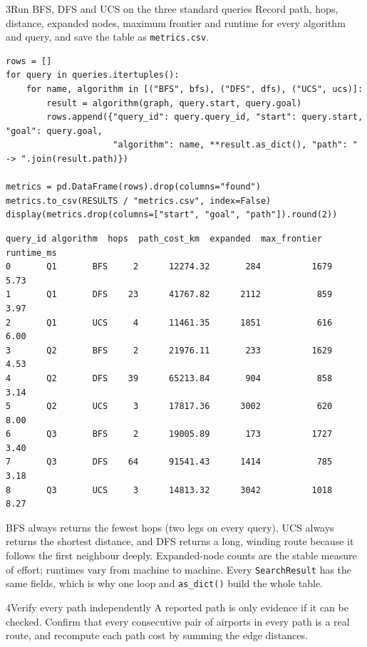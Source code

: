 \begin{labquestion}{3}{Run BFS, DFS and UCS on the three standard queries}
Record path, hops, distance, expanded nodes, maximum frontier and runtime for every algorithm and query, and save the table as \texttt{metrics.csv}.
\end{labquestion}

\begin{labanswer}
\begin{lstlisting}[style=utppython]
rows = []
for query in queries.itertuples():
    for name, algorithm in [("BFS", bfs), ("DFS", dfs), ("UCS", ucs)]:
        result = algorithm(graph, query.start, query.goal)
        rows.append({"query_id": query.query_id, "start": query.start, "goal": query.goal,
                     "algorithm": name, **result.as_dict(), "path": " -> ".join(result.path)})

metrics = pd.DataFrame(rows).drop(columns="found")
metrics.to_csv(RESULTS / "metrics.csv", index=False)
display(metrics.drop(columns=["start", "goal", "path"]).round(2))
\end{lstlisting}
\expectedoutput
\begin{lstlisting}[style=utpterminal]
  query_id algorithm  hops  path_cost_km  expanded  max_frontier  runtime_ms
0       Q1       BFS     2      12274.32       284          1679        5.73
1       Q1       DFS    23      41767.82      2112           859        3.97
2       Q1       UCS     4      11461.35      1851           616        6.00
3       Q2       BFS     2      21976.11       233          1629        4.53
4       Q2       DFS    39      65213.84       904           858        3.14
5       Q2       UCS     3      17817.36      3002           620        8.00
6       Q3       BFS     2      19005.89       173          1727        3.40
7       Q3       DFS    64      91541.43      1414           785        3.18
8       Q3       UCS     3      14813.32      3042          1018        8.27
\end{lstlisting}
BFS always returns the fewest hops (two legs on every query), UCS always returns the shortest distance, and DFS returns a long, winding route because it follows the first neighbour deeply. Expanded-node counts are the stable measure of effort; runtimes vary from machine to machine. Every \texttt{SearchResult} has the same fields, which is why one loop and \texttt{as\_dict()} build the whole table.
\end{labanswer}

\begin{labquestion}{4}{Verify every path independently}
A reported path is only evidence if it can be checked. Confirm that every consecutive pair of airports in every path is a real route, and recompute each path cost by summing the edge distances.
\end{labquestion}

